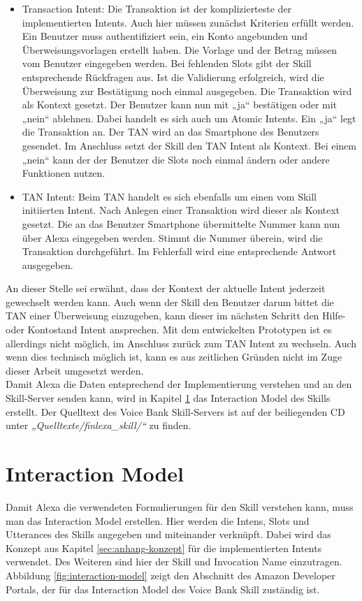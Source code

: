 \begin{itemize}
    \item Transaction Intent: Die Transaktion ist der komplizierteste der implementierten Intents. Auch hier müssen zunächst Kriterien erfüllt werden. Ein Benutzer muss authentifiziert sein, ein Konto angebunden und Überweisungsvorlagen erstellt haben. Die Vorlage und der Betrag müssen vom Benutzer eingegeben werden. Bei fehlenden Slots gibt der Skill entsprechende Rückfragen aus. Ist die Validierung erfolgreich, wird die Überweisung zur Bestätigung noch einmal ausgegeben. Die Transaktion wird als Kontext gesetzt. Der Benutzer kann nun mit „ja“ bestätigen oder mit „nein“ ablehnen. Dabei handelt es sich auch um Atomic Intents. Ein „ja“ legt die Transaktion an. Der \ac{TAN} wird an das Smartphone des Benutzers gesendet. Im Anschluss setzt der Skill den \ac{TAN} Intent als Kontext. Bei einem „nein“ kann der der Benutzer die Slots noch einmal ändern oder andere Funktionen nutzen.
    
    \item \ac{TAN} Intent: Beim \ac{TAN} handelt es sich ebenfalls um einen vom Skill initiierten Intent. Nach Anlegen einer Transaktion wird dieser als Kontext gesetzt. Die an das Benutzer Smartphone übermittelte Nummer kann nun über Alexa eingegeben werden. Stimmt die Nummer überein, wird die Transaktion durchgeführt. Im Fehlerfall wird eine entsprechende Antwort ausgegeben.
\end{itemize}

An dieser Stelle sei erwähnt, dass der Kontext \bzw der aktuelle Intent jederzeit gewechselt werden kann. Auch wenn der Skill den Benutzer darum bittet die \ac{TAN} einer Überweisung einzugeben, kann dieser im nächsten Schritt den Hilfe- oder Kontostand Intent ansprechen. Mit dem entwickelten Prototypen ist es allerdings nicht möglich, im Anschluss zurück zum \ac{TAN} Intent zu wechseln. Auch wenn dies technisch möglich ist, kann es aus zeitlichen Gründen nicht im Zuge dieser Arbeit umgesetzt werden.\\
Damit Alexa die Daten entsprechend der Implementierung verstehen und an den Skill-Server senden kann, wird in Kapitel \ref{sec:interaction-model} das Interaction Model des Skills erstellt. Der Quelltext des Voice Bank Skill-Servers ist auf der beiliegenden CD unter \textit{„Quelltexte/finlexa\_skill/“} zu finden.

\section{Interaction Model}
\label{sec:interaction-model}
Damit Alexa die verwendeten Formulierungen für den Skill verstehen kann, muss man das Interaction Model erstellen. Hier werden die Intens, Slots und Utterances des Skills angegeben und miteinander verknüpft. Dabei wird das Konzept aus Kapitel \ref{sec:anhang-konzept} für die implementierten Intents verwendet. Des Weiteren sind hier der Skill und Invocation Name einzutragen.  Abbildung \ref{fig:interaction-model} zeigt den Abschnitt des Amazon Developer Portals, der für das Interaction Model des Voice Bank Skill zuständig ist. \newpage

